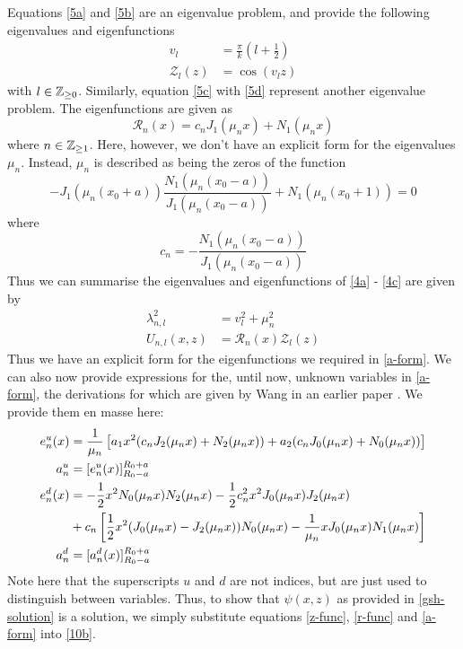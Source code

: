 Equations \ref{5a} and \ref{5b} are an eigenvalue problem, and provide the following eigenvalues and eigenfunctions
\begin{align}
    v_l &= \frac{\pi}{k} \left (l + \frac{1}{2} \right ) \\
    \label{z-func} \mathcal{Z}_l(z) &= \cos(v_l z)
\end{align}
with $l \in \mathbb{Z}_{\ge 0}$. Similarly, equation \ref{5c} with \ref{5d} represent another eigenvalue problem. The eigenfunctions 
are given as
\begin{equation}
    \label{r-func} \mathcal{R}_n(x) = c_n J_1(\mu_n x) + N_1(\mu_n x)
\end{equation}
where $n \in \mathbb{Z}_{\ge 1}$. Here, however, we don't have an explicit form for the eigenvalues $\mu_n$. Instead, 
$\mu_n$ is described as being the zeros of the function
\begin{equation}
    -J_1(\mu_n (x_0 + a)) \frac{N_1(\mu_n (x_0 - a))}{J_1 (\mu_n (x_0 - a))} + N_1(\mu_n (x_0 + 1)) = 0
\end{equation}
where
$$c_n = -\frac{N_1(\mu_n (x_0 - a))}{J_1 (\mu_n (x_0 - a))}$$
Thus we can summarise the eigenvalues and eigenfunctions of \ref{4a} - \ref{4c} are given by
\begin{align}
    \lambda_{n,l}^2 &= v_l^2 + \mu_n^2 \\
    U_{n,l}(x,z) &= \mathcal{R}_n(x) \mathcal{Z}_l(z)
\end{align}
Thus we have an explicit form for the eigenfunctions we required in \ref{a-form}. We can also now 
provide expressions for the, until now, unknown variables in \ref{a-form}, the derivations for which are 
given by Wang in an earlier paper \cite{wang-precursor}. We provide them en masse here:
\begin{align}
    e_n^u(x) &= \frac{1}{\mu_n} \left [ a_1 x^2 (c_n J_2(\mu_n x) + N_2(\mu_n x)) + a_2 (c_n J_0 (\mu_n x) + N_0(\mu_n x)) \right ] \\
    a_n^u &= [e_n^u(x)]_{R_0 - a}^{R_0 + a} \\
    e_n^d(x) &= -\frac{1}{2} x^2 N_0(\mu_n x) N_2(\mu_n x) - \frac{1}{2} c_n^2 x^2 J_0(\mu_n x) J_2(\mu_n x) \\
    \notag &+ c_n \left [ \frac{1}{2}x^2 (J_0(\mu_n x) - J_2(\mu_n x) )N_0(\mu_n x) - \frac{1}{\mu_n} x J_0(\mu_n x) N_1(\mu_n x) \right ] \\
    a_n^d &= [a_n^d (x)]_{R_0-a}^{R_0+a}
\end{align}
Note here that the superscripts $u$ and $d$ are not indices, but are just used to distinguish between variables. Thus, to show that $\psi(x,z)$ as
provided in \ref{gsh-solution} is a solution, we simply substitute equations \ref{z-func}, \ref{r-func} and \ref{a-form} into \ref{10b}.

